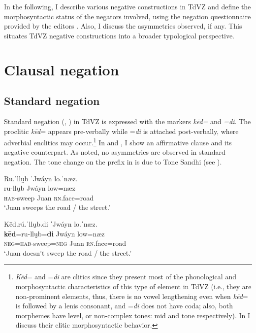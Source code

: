 \documentclass[output=paper,colorlinks=true, citecolor=brown]{langscibook}
\begin{document}
In the following, I describe various negative constructions in TdVZ and define the morphosyntactic status of the negators involved, using the negation questionnaire provided by the editors  . Also, I discuss the asymmetries observed, if any. This  situates TdVZ negative constructions into a broader typological perspective.

\section{Clausal negation} \label{sec:zap:2}
\subsection{Standard negation} \label{sec:zap:2.1}

Standard negation (\citealt{Payne1985}, \citealt{Miestamo2005}) in TdVZ is expressed with the markers \textit{kēd=} and \textit{=di}. The proclitic \textit{kēd}= appears pre-verbally while =\textit{di} is attached post-verbally, where adverbial enclitics may occur.\footnote{\textit{Kēd}= and =\textit{di} are clitics since they present most of the phonological and morphosyntactic characteristics of this type of element in TdVZ (i.e., they are non-prominent elements, thus, there is no vowel lengthening even when \textit{kēd}= is followed by a lenis consonant, and =\textit{di} does not have coda; also, both morphemes have level, or non-complex tones: mid and tone respectively). In  I discuss their clitic morphosyntactic behavior.} In  and , I show an affirmative clause and its negative counterpart. As noted, no asymmetries are observed in standard negation. The tone change on the prefix in  is due to Tone Sandhi (see ).

\ea\label{ex:zap:6} 
    \glll Ru.ˈllṵb ˈJwáyn lo.ˈnæz.\\ 
          ru-llṵb Jwáyn low=næz\\
          \textsc{hab}{}-sweep Juan \textsc{rn}.face=road\\
    \glt ‘Juan sweeps the road / the street.’
\z 

\ea\label{ex:zap:7} 
    \glll Kēd.rú.ˈllṵb.di ˈJwáyn lo.ˈnæz.\\ 
          \textbf{kēd}=ru-llṵb=\textbf{di} Jwáyn low=næz\\
          \textsc{neg}=\textsc{hab}{}-sweep=\textsc{neg} Juan \textsc{rn}.face=road\\
    \glt ‘Juan doesn’t sweep the road / the street.’
\z 
\end{document}
